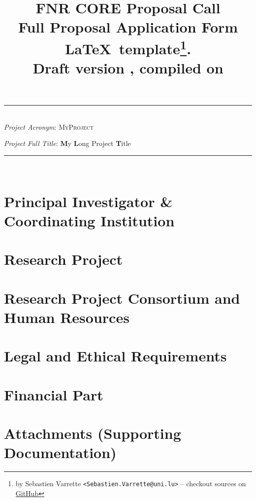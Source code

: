 \documentclass[11pt,twoside,a4paper]{article}
\title{\textbf{\Large FNR CORE Proposal Call} \\[1em]
  {\small Full Proposal Application Form \LaTeX\ template\thanks{by Sebastien
      Varrette {\small \texttt{<Sebastien.Varrette@uni.lu>}} -- checkout sources
      on \href{https://github.com/Falkor/fnr-latex-template}{GitHub}}.\\
    \textbf{Draft version \docversion}, compiled on \isodayandtime}
}
\author{}
\date{}
\newcommand{\project}{\textsc{MyProject}\xspace}
\newcommand{\fulltitle}{\textbf{M}y \textbf{L}ong \textsc{P}roject \textbf{T}itle\xspace}
\begin{document}
\maketitle
{\Large
  \begin{center}
      \hrule
      ~\\
      \emph{Project Acronym}: \project

      \emph{Project Full Title}: \fulltitle\\[1em]
  \end{center}
}
\hrule
~\\[1em]

\clearpage
\tableofcontents
\clearpage

\section{Principal Investigator \& Coordinating Institution}


\section{Research Project}

  
\section{Research Project Consortium and Human Resources}

  
\section{Legal and Ethical Requirements}


\section{Financial Part}


\section{Attachments (Supporting Documentation)}
\end{document}
